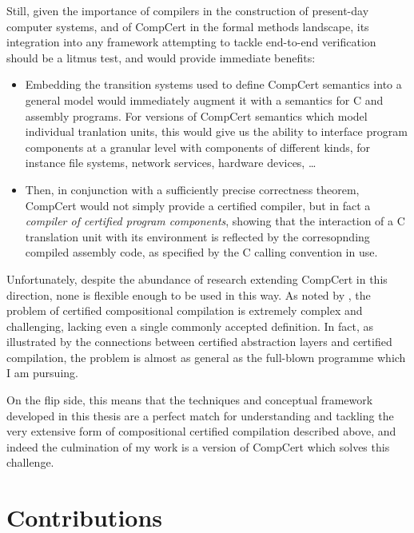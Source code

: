 \documentclass[11pt,oneside,draft]{book}
\theoremstyle{definition}
\begin{document}
Still,
given the importance of compilers in
the construction of present-day computer systems,
and of CompCert in the formal methods landscape,
its integration into any framework
attempting to tackle end-to-end verification
should be a litmus test,
and would provide immediate benefits:
\begin{itemize}
  \item
    Embedding the transition systems
    used to define CompCert semantics
    into a general model
    would immediately augment it with
    a semantics for C and assembly programs.
    For versions of CompCert semantics
    which model individual tranlation units,
    this would give us the ability to
    interface program components at a granular level
    with components of different kinds,
    for instance
    file systems, network services, hardware devices,
    \ldots
  \item
    Then,
    in conjunction with a sufficiently precise
    correctness theorem,
    CompCert would not simply provide
    a certified compiler,
    but in fact
    a \emph{compiler of certified program components},
    showing that the interaction of a C translation unit
    with its environment
    is reflected by the corresopnding compiled assembly code,
    as specified by the C calling convention in use.
\end{itemize}

Unfortunately,
despite the abundance of research
extending CompCert in this direction,
none is flexible enough to be used in this way.
As noted by \citet{next700},
the problem of certified compositional compilation
is extremely complex and challenging,
lacking even a single commonly accepted definition.
In fact,
as illustrated by the connections between
certified abstraction layers and
certified compilation,
the problem is almost as general
as the full-blown programme which I am pursuing.

On the flip side,
this means that the techniques and conceptual framework
developed in this thesis
are a perfect match
for understanding and tackling
the very extensive form of
compositional certified compilation
described above,
and indeed the culmination of my work
is a version of CompCert
which solves this challenge.


\section{Contributions} %
\label{ssec:contrib}
\end{document}
